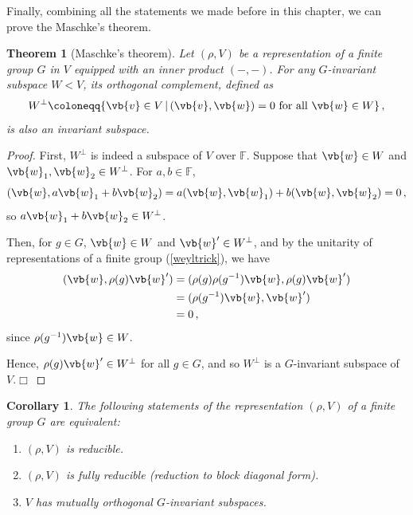 \documentclass{article}
\theoremstyle{plain}\theoremheaderfont{\normalfont\itshape}\theorembodyfont{\rmfamily}\theoremseparator{.}\newtheorem*{rem}{Remark}\newtheorem*{ex}{Example}\newtheorem*{proof}{Proof}\newtheorem*{altp}{Alternative proof}
\theoremstyle{plain}\theoremheaderfont{\normalfont\bfseries}\theorembodyfont{\rmfamily}\theoremseparator{.}\newtheorem{thm}{Theorem}[section]\newtheorem{lem}[thm]{Lemma}\newtheorem{prop}[thm]{Proposition}\newtheorem*{cor}{Corollary}\newtheorem{defn}[thm]{Definition}\newtheorem{clm}[thm]{Claim}\newtheorem{clminproof}{Claim}
\theoremstyle{break}\theoremheaderfont{\normalfont\itshape}\theorembodyfont{\rmfamily}\theoremseparator{.\medskip}\newtheorem*{proofskip}{Proof}\newtheorem*{exs}{Examples}\newtheorem*{rems}{Remarks}
\theoremstyle{break}\theoremheaderfont{\normalfont\bfseries}\theorembodyfont{\rmfamily}\theoremseparator{.\medskip}\newtheorem{lemskip}[thm]{Lemma}\newtheorem{defnskip}[thm]{Definition}\newtheorem{propskip}[thm]{Proposition}\newtheorem{thmskip}[thm]{Theorem}
\numberwithin{equation}{section}
\newcommand{\qed}{\hfill\ensuremath{\Box}}
\begin{document}
	Finally, combining all the statements we made before in this chapter, we can prove the Maschke's theorem.
	\begin{thm}[Maschke's theorem]
		Let \((\rho,V)\) be a representation of a finite group \(G\) in \(V\) equipped with an inner product \((-,-)\). For any \(G\)-invariant subspace \(W<V\), its \textit{orthogonal complement}, defined as
		\[W^\perp \coloneqq\{\vb{v}\in V\,|\,(\vb{v},\vb{w})=0\text{ for all }\vb{w}\in W\}\,,\]
		is also an invariant subspace.
	\end{thm}
	\begin{proof}
		First, \(W^\perp\) is indeed a subspace of \(V\) over \(\mathbb{F}\). Suppose that \(\vb{w}\in W\) and \(\vb{w}_1,\vb{w}_2\in W^\perp\). For \(a,b\in\mathbb{F}\),
		\[(\vb{w},a\vb{w}_1+b\vb{w}_2)=a(\vb{w},\vb{w}_1)+b(\vb{w},\vb{w}_2)=0\,,\]
		so \(a\vb{w}_1+b\vb{w}_2\in W^\perp\).

		Then, for \(g\in G\), \(\vb{w}\in W\) and \(\vb{w}'\in W^\perp\),	and by the unitarity of representations of a finite group (\cref{weyltrick}), we have
		\begin{align*}
			(\vb{w},\rho(g)\vb{w}')&=(\rho(g)\rho(g^{-1})\vb{w},\rho(g)\vb{w}')\\
			&=(\rho(g^{-1})\vb{w},\vb{w}')\\
			&=0\,,
		\end{align*}
		since \(\rho(g^{-1})\vb{w}\in W\).

		Hence, \(\rho(g)\vb{w}'\in W^\perp\) for all \(g\in G\), and so \(W^\perp\) is a \(G\)-invariant subspace of \(V\).\qed
	\end{proof}
	\begin{cor}
		The following statements of the representation \((\rho,V)\) of a finite group \(G\) are equivalent:
		\begin{enumerate}[topsep=0pt]
			\item[(i)] \((\rho,V)\) is reducible.
			\item[(ii)] \((\rho,V)\) is fully reducible (reduction to block diagonal form).
			\item[(iii)] \(V\) has mutually orthogonal \(G\)-invariant subspaces.
		\end{enumerate}
	\end{cor}
\end{document}
